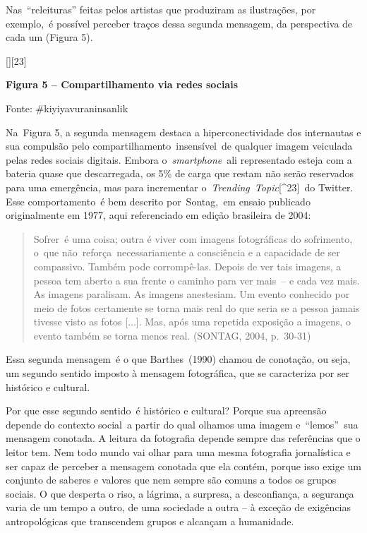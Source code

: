 \documentclass[
  letterpaper,
]{abntex2}
\begin{document}
Nas~``releituras'' feitas pelos artistas que produziram as ilustrações,
por exemplo,~é possível perceber traços dessa segunda mensagem, da
perspectiva de cada um (Figura 5). ~

{[}{]}{[}23{]}~

\protect\hypertarget{_Ref503520168}{}{}\textbf{Figura 5 --
Compartilhamento via redes sociais}

Fonte: \#kiyiyavuraninsanlik~ ~

Na~Figura 5, a segunda mensagem destaca a hiperconectividade dos
internautas e sua compulsão pelo compartilhamento~insensível~de qualquer
imagem veiculada pelas redes sociais digitais. Embora
o~\emph{smartphone}~ali representado esteja com a bateria quase que
descarregada, os 5\% de carga que restam não serão reservados para uma
emergência, mas para incrementar o~\emph{Trending~Topic}{[}\^{}23{]}~do
Twitter. Esse comportamento~é bem descrito por~Sontag,~em ensaio
publicado originalmente em 1977, aqui referenciado em edição brasileira
de 2004:~ ~

\begin{quote}
Sofrer~é uma coisa; outra é viver com imagens fotográficas do
sofrimento, o~que não~reforça~necessariamente a consciência e a
capacidade de ser compassivo. Também pode corrompê-las. Depois de ver
tais imagens, a pessoa tem aberto a sua frente o caminho para ver
mais~-- e cada vez mais. As imagens paralisam. As imagens anestesiam. Um
evento conhecido por meio de fotos certamente se torna mais real do que
seria se a pessoa jamais tivesse visto as fotos {[}...{]}. Mas, após uma
repetida exposição a imagens, o evento também se torna menos real.
(SONTAG, 2004, p.~30-31)~ ~
\end{quote}

Essa segunda mensagem~é o que Barthes~(1990) chamou de conotação, ou
seja, um segundo sentido imposto à mensagem fotográfica, que se
caracteriza por ser histórico e cultural.~

Por que esse segundo sentido~é histórico e cultural? Porque sua
apreensão depende do contexto social~a partir do qual olhamos uma imagem
e~``lemos''\emph{~}sua mensagem conotada. A leitura da fotografia
depende sempre das referências que o leitor tem. Nem todo mundo vai
olhar para uma mesma fotografia jornalística e ser capaz de perceber a
mensagem conotada que ela contém, porque isso exige um conjunto de
saberes e valores que nem sempre são comuns a todos os grupos sociais. O
que desperta o riso, a lágrima, a surpresa, a desconfiança, a segurança
varia de um tempo a outro, de uma sociedade a outra -- à exceção de
exigências antropológicas que transcendem grupos e alcançam a
humanidade.~
\end{document}
